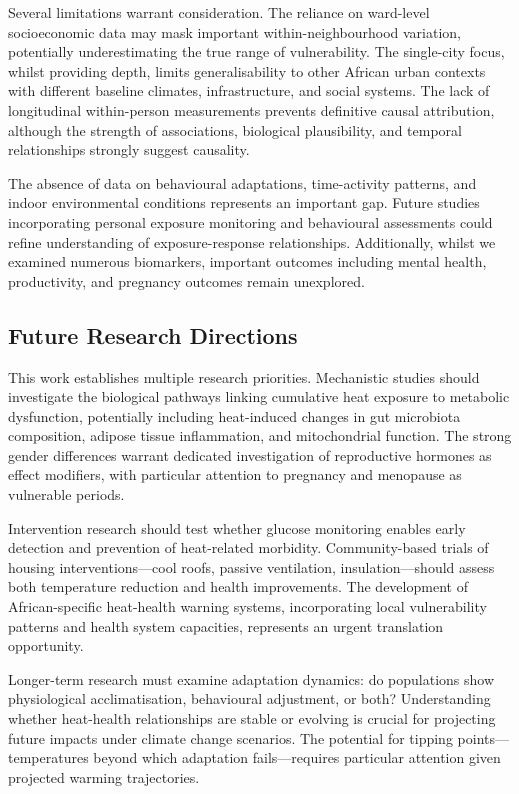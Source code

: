 \documentclass[11pt,a4paper]{article}
\begin{document}
Several limitations warrant consideration. The reliance on ward-level socioeconomic data may mask important within-neighbourhood variation, potentially underestimating the true range of vulnerability. The single-city focus, whilst providing depth, limits generalisability to other African urban contexts with different baseline climates, infrastructure, and social systems. The lack of longitudinal within-person measurements prevents definitive causal attribution, although the strength of associations, biological plausibility, and temporal relationships strongly suggest causality.

The absence of data on behavioural adaptations, time-activity patterns, and indoor environmental conditions represents an important gap. Future studies incorporating personal exposure monitoring and behavioural assessments could refine understanding of exposure-response relationships. Additionally, whilst we examined numerous biomarkers, important outcomes including mental health, productivity, and pregnancy outcomes remain unexplored.

\subsection{Future Research Directions}

This work establishes multiple research priorities. Mechanistic studies should investigate the biological pathways linking cumulative heat exposure to metabolic dysfunction, potentially including heat-induced changes in gut microbiota composition, adipose tissue inflammation, and mitochondrial function. The strong gender differences warrant dedicated investigation of reproductive hormones as effect modifiers, with particular attention to pregnancy and menopause as vulnerable periods.

Intervention research should test whether glucose monitoring enables early detection and prevention of heat-related morbidity. Community-based trials of housing interventions---cool roofs, passive ventilation, insulation---should assess both temperature reduction and health improvements. The development of African-specific heat-health warning systems, incorporating local vulnerability patterns and health system capacities, represents an urgent translation opportunity.

Longer-term research must examine adaptation dynamics: do populations show physiological acclimatisation, behavioural adjustment, or both? Understanding whether heat-health relationships are stable or evolving is crucial for projecting future impacts under climate change scenarios. The potential for tipping points---temperatures beyond which adaptation fails---requires particular attention given projected warming trajectories.
\end{document}
